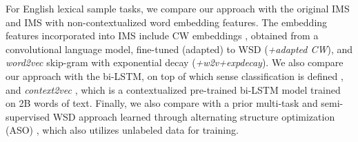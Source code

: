 \documentclass[11pt,a4paper]{article}
\begin{document}
For English lexical sample tasks, we compare our approach with the original IMS \cite{zhong_it_2010} and IMS with non-contextualized word embedding features. The embedding features incorporated into IMS include CW embeddings \cite{collobert_natural_2011}, obtained from a convolutional language model, fine-tuned (adapted) to WSD \cite{taghipour_semi-supervised_2015} (\textit{+adapted CW}), and \textit{word2vec} skip-gram \cite{mikolov_efficient_2013} with exponential decay \cite{iacobacci_embeddings_2016} (\textit{+w2v+expdecay}). We also compare our approach with the bi-LSTM, on top of which sense classification is defined \cite{kageback_word_2016}, and \textit{context2vec} \cite{melamud_context2vec:_2016}, which is a contextualized pre-trained bi-LSTM model trained on 2B words of text. Finally, we also compare with a prior multi-task and semi-supervised WSD approach learned through alternating structure optimization (ASO) \cite{ando_applying_2006}, which also utilizes unlabeled data for training.
\end{document}
